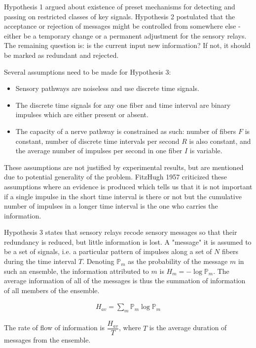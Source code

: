 \documentclass[twoside]{article}
\begin{document}
\begin{multicols}{2}
Hypothesis 1 argued about existence of preset mechanisms for detecting and passing on restricted classes of key signals. Hypothesis 2 postulated that the acceptance or rejection of messages might be controlled from somewhere else - either be a temporary change or a permanent adjustment for the sensory relays. The remaining question is: is the current input new information? If not, it should be marked as redundant and rejected. 

Several assumptions need to be made for Hypothesis 3:
\begin{itemize}
	\item Sensory pathways are noiseless and use discrete time signals.
	\item The discrete time signals for any one fiber and time interval are binary impulses which are either present or absent.
	\item The capacity of a nerve pathway is constrained as such: number of fibers $F$ is constant, number of discrete time intervals per second $R$ is also constant, and the average number of impulses per second in one fiber $I$ is variable.
\end{itemize}

These assumptions are not justified by experimental results, but are mentioned due to potential generality of the problem. FitzHugh 1957 criticized these assumptions where an evidence is produced which tells us that it is not important if a single impulse in the short time interval is there or not but the cumulative number of impulses in a longer time interval is the one who carries the information. 

Hypothesis 3 states that sensory relays recode sensory messages so that their redundancy is reduced, but little information is lost. A "message" it is assumed to be a set of signals, i.e. a particular pattern of impulses along a set of $N$ fibers during the time interval $T$. Denoting $\mathbb{P}_m$ as the probability of the message $m$ in such an ensemble, the information attributed to $m$ is $H_{m}=-\log \mathbb{P}_m$. The average information of all of the messages is thus the summation of information of all members of the ensemble.

\begin{align} \label{eq:1}
	H_{av}= \sum_m \mathbb{P}_m \log \mathbb{P}_m
\end{align}

The rate of flow of information is $\dfrac{H_{av}}{T}$, where $T$ is the average duration of messages from the ensemble.


\end{multicols}
\end{document}

